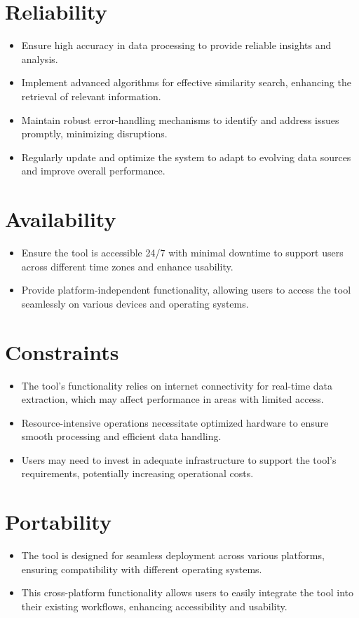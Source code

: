 \documentclass[12pt,a4paper]{report}
\begin{document}
{\begin{itemize}
\end{itemize}
\section{Reliability}
\begin{itemize}
	\item Ensure high accuracy in data processing to provide reliable insights and analysis.
	\item Implement advanced algorithms for effective similarity search, enhancing the retrieval of relevant information.
	\item Maintain robust error-handling mechanisms to identify and address issues promptly, minimizing disruptions.
	\item Regularly update and optimize the system to adapt to evolving data sources and improve overall performance.
\end{itemize}
\section{Availability}
\begin{itemize}
	\item Ensure the tool is accessible 24/7 with minimal downtime to support users across different time zones and enhance usability. 
	\item Provide platform-independent functionality, allowing users to access the tool seamlessly on various devices and operating systems.	
\end{itemize}
\section{Constraints}
\begin{itemize}
    \item The tool's functionality relies on internet connectivity for real-time data extraction, which may affect performance in areas with limited access.
    \item Resource-intensive operations necessitate optimized hardware to ensure smooth processing and efficient data handling.
    \item Users may need to invest in adequate infrastructure to support the tool's requirements, potentially increasing operational costs.
\end{itemize}
\section{Portability}
\begin{itemize}
	\item The tool is designed for seamless deployment across various platforms, ensuring compatibility with different operating systems.
	\item This cross-platform functionality allows users to easily integrate the tool into their existing workflows, enhancing accessibility and usability.	
\end{itemize}
}
\end{document}
